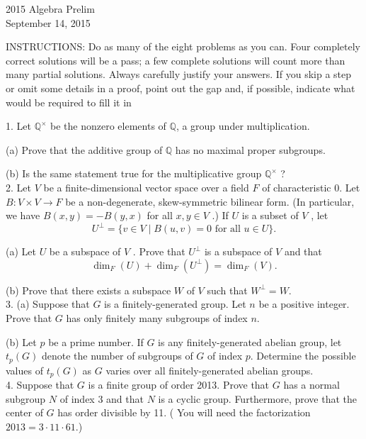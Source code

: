 \documentclass[11pt]{article}
\newcommand{\Q}{\mathbb{Q}}
\begin{document}
\begin{center}
\Large 2015 Algebra Prelim\\
\normalsize September 14, 2015
\end{center}
\vspace{1em}

INSTRUCTIONS: Do as many of the eight problems as you can. Four completely
correct solutions will be a pass; a few complete solutions will count more than many
partial solutions. Always carefully justify your answers. If you skip a step or omit
some details in a proof, point out the gap and, if possible, indicate what would be
required to fill it in\\
\vspace{1em}

1. Let $\Q^\times$
be the nonzero elements of $\Q$, a group under multiplication.

(a) Prove that the additive group of $\Q$ has no maximal proper subgroups.

(b) Is the same statement true for the multiplicative group $\Q^\times$ ?\\

2. Let $V$ be a finite-dimensional vector space over a field $F$ of characteristic 0.
Let $B : V \times V \to F$ be a non-degenerate, skew-symmetric bilinear form. (In particular, we
have $B(x, y) = −B(y, x)$ for all $x, y \in V$ .) If $U$ is a subset of $V$ , let\[
U^\perp = \{v\in V \mid B(u,v) = 0 \text{ for all } u\in U\}.
\]

(a) Let $U$ be a subspace of $V$ . Prove that $U^\perp$ is a subspace of $V$ and that \[\dim_F(U) + \dim_F(U^\perp) = \dim_F(V).\]

(b) Prove that there exists a subspace $W$ of $V$ such that $W^\perp = W$. \\

3. (a) Suppose that $G$ is a finitely-generated group. Let $n$ be a positive integer. Prove that
$G$ has only finitely many subgroups of index $n$.

(b) Let $p$ be a prime number. If $G$ is any finitely-generated abelian group, let $t_p(G)$ denote
the number of subgroups of $G$ of index $p$. Determine the possible values of $t_p(G)$ as $G$ varies
over all finitely-generated abelian groups.\\

4. Suppose that $G$ is a finite group of order 2013. Prove that $G$ has a normal
subgroup $N$ of index 3 and that $N$ is a cyclic group. Furthermore, prove that the center of
$G$ has order divisible by 11. ( You will need the factorization $2013 = 3 \cdot  11 \cdot 61$.)\\
\end{document}
